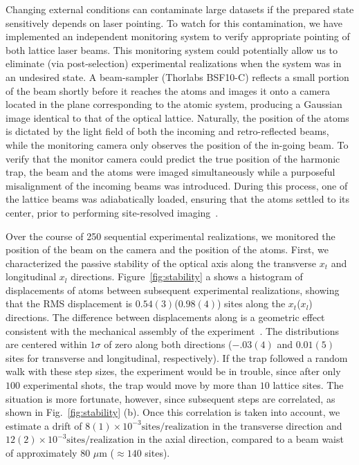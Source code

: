 \documentclass[twocolumn,aps,pra,showpacs,preprintnumbers,bibnotes]{revtex4-1}
\begin{document}
Changing external conditions can contaminate large datasets if the prepared state sensitively depends on laser pointing.
To watch for this contamination, we have implemented an independent monitoring system to verify appropriate pointing of both lattice laser beams.
This monitoring system could potentially allow us to eliminate (via post-selection) experimental realizations when the system was in an undesired state.
A beam-sampler (Thorlabs BSF10-C) reflects a small portion of the beam shortly before it reaches the atoms and images it onto a camera located in the plane corresponding to the atomic system, producing a Gaussian image identical to that of the optical lattice.
Naturally, the position of the atoms is dictated by the light field of both the incoming and retro-reflected beams, while the monitoring camera only observes the position of the in-going beam.
To verify that the monitor camera could predict the true position of the harmonic trap, the beam and the atoms were imaged simultaneously while a purposeful misalignment of the incoming beams was introduced.
During this process, one of the lattice beams was adiabatically loaded, ensuring that the atoms settled to its center, prior to performing site-resolved imaging~\cite{Parsons2015}.

Over the course of 250 sequential experimental realizations, we monitored the position of the beam on the camera and the position of the atoms.
First, we characterized the passive stability of the optical axis along the transverse $x_t$ and longitudinal $x_l$ directions.
Figure~\ref{fig:stability} a shows a histogram of displacements of atoms between subsequent experimental realizations, showing that the RMS displacement is $0.54(3)$($0.98(4)$) sites along the $x_t$($x_l$) directions.
The difference between displacements along is a geometric effect consistent with the mechanical assembly of the experiment~\cite{Huber2014}.
The distributions are centered within $1\sigma$ of zero along both directions ($-.03(4)$ and $0.01(5)$ sites for transverse and longitudinal, respectively).
If the trap followed a random walk with these step sizes, the experiment would be in trouble, since after only $100$ experimental shots, the trap would move by more than $10$ lattice sites.
The situation is more fortunate, however, since subsequent steps are correlated, as shown in Fig.~\ref{fig:stability} (b).
Once this correlation is taken into account, we estimate a drift of $8(1)\times 10^{-3}\mathrm{sites}/\mathrm{realization}$ in the transverse direction and $12(2)\times 10^{-3}\mathrm{sites}/\mathrm{realization}$ in the axial direction, compared to a beam waist of approximately $80$ $\mu$m ($\approx 140$ sites).
\end{document}
